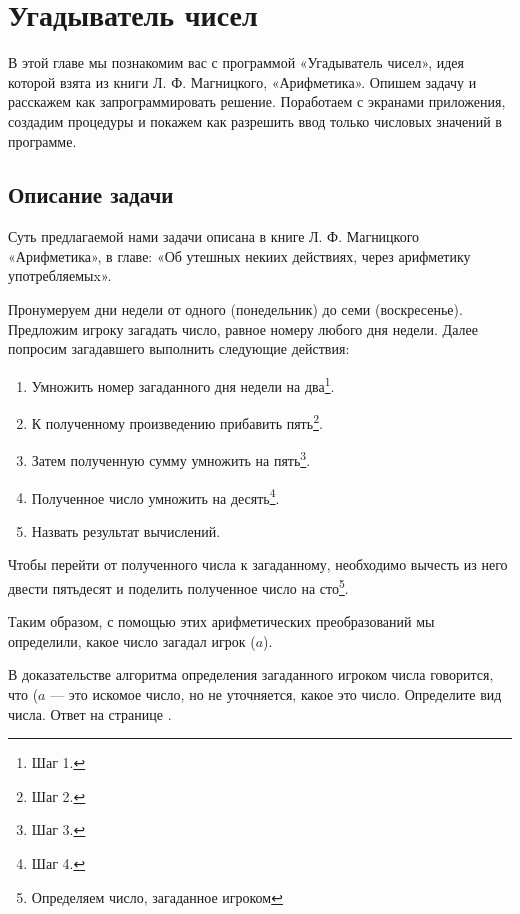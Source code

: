 \chapter{Угадыватель чисел}
\label{ch:guessnumbers}

В этой главе мы познакомим вас с программой «Угадыватель чисел»\cite{PanfilovaApp}, идея которой взята из книги Л. Ф. Магницкого, «Арифметика»\cite{Galanin}. 
Опишем задачу и расскажем как запрограммировать решение. Поработаем с экранами приложения, создадим процедуры и покажем как разрешить ввод только числовых значений в программе.


\section{Описание задачи}

Суть предлагаемой нами задачи описана в книге Л. Ф. Магницкого «Арифметика», в главе: «Об утешных некиих действиях, через арифметику употребляемыx»\cite{Galanin}.

Пронумеруем дни недели от одного (понедельник) до семи (воскресенье). 
Предложим игроку загадать число, равное номеру любого дня недели. Далее попросим загадавшего выполнить следующие действия:
\begin{enumerate}
\item Умножить номер загаданного дня недели на два\footnote[][-0cm]{Шаг 1.}. 
\item К полученному произведению прибавить пять\footnote[][-0cm]{Шаг 2.}.
\item Затем полученную сумму умножить на пять\footnote[][-0cm]{Шаг 3.}.
\item Полученное число умножить на десять\footnote[][-0cm]{Шаг 4.}.
\item Назвать результат вычислений.
\end{enumerate}

Чтобы перейти от полученного числа к загаданному, необходимо вычесть из него двести пятьдесят и поделить полученное число на сто\footnote[][-0cm]{Определяем число, загаданное игроком}. 

Таким образом, с помощью этих арифметических преобразований мы определили, какое число загадал игрок ($ a $).
\begin{mdfstyle}[nobreak=true,frametitle=Вопрос]
  \sloppy   
  В доказательстве алгоритма определения загаданного игроком числа говорится, что ($ a $ — это искомое число, но не уточняется, какое это число. 
  Определите вид числа.  Ответ на странице \pageref{answer:guess_numbers_task}.
  \label{question:text}
\end{mdfstyle}

